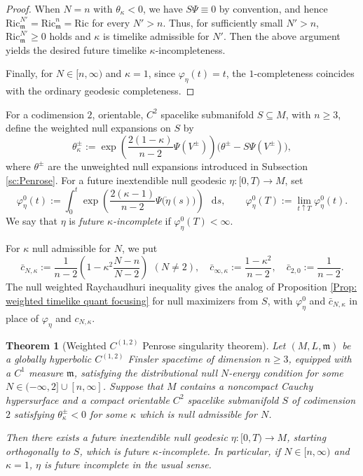 \documentclass[a4paper,11pt]{article}
\numberwithin{equation}{section}
\theoremstyle{definition}
\theoremstyle{plain}
\newtheorem{Theorem}[Definition]{Theorem}
\newcommand{\Ric}{\mathrm{Ric}}
\newcommand{\m}{\mathfrak m}
\newcommand*\diff{\mathop{}\!\mathrm{d}}
\begin{document}
\begin{proof}
When $N=n$ with $\theta_\kappa<0$, we have $S\Psi \equiv 0$ by convention, and hence $\Ric_\m^{N'} =\Ric_\m^n =\Ric$ for every $N'>n$.
Thus, for sufficiently small $N'>n$, $\Ric_\m^{N'} \ge 0$ holds and $\kappa$ is timelike admissible for $N'$.
Then the above argument yields the desired future timelike $\kappa$-incompleteness.

Finally, for $N\in[ n,\infty)$ and $\kappa=1$, since $\varphi_\eta(t)=t$, the $1$-completeness coincides with the ordinary geodesic completeness. 
\end{proof}

For a codimension $2$, orientable, $C^2$ spacelike submanifold $S\subseteq M$, with $n\geq3$, define the weighted null expansions on $S$ by
\[
    \theta_\kappa^\pm
    :=
    \exp\left(
        \frac{2(1-\kappa)}{n-2}\Psi(V^\pm)
    \right)
    \bigl(\theta^\pm-S\Psi(V^\pm)\bigr),
\]
where $\theta^\pm$ are the unweighted null expansions introduced in Subsection \ref{sc:Penrose}.
For a future inextendible null geodesic $\eta:[0,T)\to M$, set
\[
    \varphi_\eta^0(t)
    :=
    \int_0^t
    \exp\left(
        \frac{2(\kappa-1)}{n-2}\Psi\bigl(\dot\eta(s)\bigr)
    \right)\,\diff s,
    \qquad
    \varphi_\eta^0(T)
    :=
    \lim_{t\uparrow T}\varphi_\eta^0(t).
\]
We say that $\eta$ is \emph{future $\kappa$-incomplete} if $\varphi_\eta^0(T)<\infty$.

For $\kappa$ null admissible for $N$, we put
\[
    \bar c_{N,\kappa}
    :=
    \frac1{n-2}
    \left(1-\kappa^2\frac{N-n}{N-2}\right) \,\ (N\ne2),
    \quad \bar c_{\infty,\kappa}:=\frac{1-\kappa^2}{n-2},
    \quad \bar c_{2,0}:=\frac1{n-2}.
\]
The null weighted Raychaudhuri inequality \cite[Prop.\ 6.2]{LuMinguzziOhtaSingularity} gives the analog of Proposition \ref{Prop: weighted timelike quant focusing} for null maximizers from $S$, with $\varphi_\eta^0$ and $\bar c_{N,\kappa}$ in place of $\varphi_\eta$ and $c_{N,\kappa}$.


\begin{Theorem}[Weighted $C^{(1,2)}$ Penrose singularity theorem]
\label{theorem: weighted penrose}
Let $(M,L,\mathfrak m)$ be a globally hyperbolic $C^{(1,2)}$ Finsler spacetime of dimension $n\geq3$, equipped with a $C^1$ measure  $\mathfrak m$, satisfying the distributional null $N$-energy condition for some $N\in(-\infty,2]\cup[n,\infty]$.
Suppose that $M$ contains a noncompact Cauchy hypersurface and a compact orientable $C^2$ spacelike submanifold $S$ of codimension $2$ satisfying $\theta_\kappa^\pm<0$ for some $\kappa$ which is null admissible for $N$. 

Then there exists a future inextendible null geodesic $\eta:[0,T)\to M$, starting orthogonally to $S$, which is future $\kappa$-incomplete.
In particular, if $N\in[n,\infty)$ and $\kappa=1$, $\eta$ is future incomplete in the usual sense.
\end{Theorem}
\end{document}
